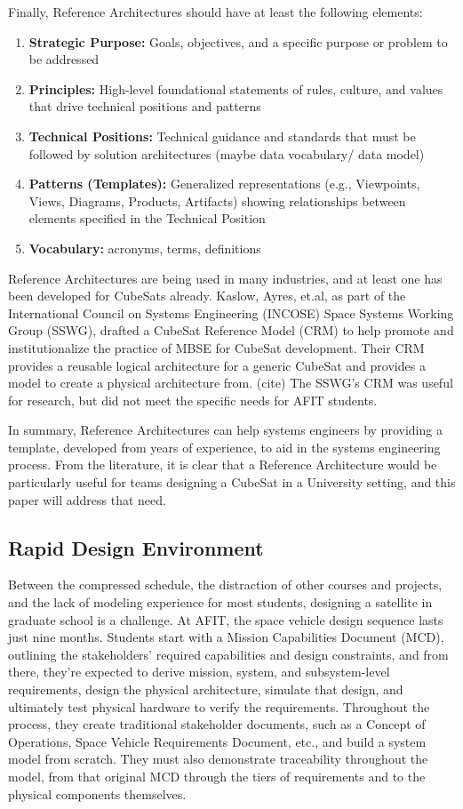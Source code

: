 \documentclass[conference]{joss-pretty}
\begin{document}
Finally, Reference Architectures should have at least the following elements:
\begin{enumerate}
\item{\textbf{Strategic Purpose:} Goals, objectives, and a specific purpose or problem to be addressed}
\item{\textbf{Principles:} High-level foundational statements of rules, culture, and values that drive  technical positions and patterns}
\item{\textbf{Technical Positions:} Technical guidance and standards that must be followed by solution  architectures (maybe data vocabulary/ data model)}
\item{\textbf{Patterns (Templates):} Generalized representations (e.g., Viewpoints, Views, Diagrams, Products, Artifacts) showing relationships between elements specified in the Technical Position}
\item{\textbf{Vocabulary:} acronyms, terms, definitions}
\end{enumerate}

Reference Architectures are being used in many industries, and at least one has been developed for CubeSats already. Kaslow, Ayres, et.al, as part of the International Council on Systems Engineering (INCOSE) Space Systems Working Group (SSWG), drafted a CubeSat Reference Model (CRM) to help promote and institutionalize the practice of MBSE for CubeSat development. Their CRM provides a reusable logical architecture for a generic CubeSat and provides a model to create a physical architecture from. (cite) The SSWG's CRM was useful for research, but did not meet the specific needs for AFIT students.

In summary, Reference Architectures can help systems engineers by providing a template, developed from years of experience, to aid in the systems engineering process. From the literature, it is clear that a Reference Architecture would be particularly useful for teams designing a CubeSat in a University setting, and this paper will address that need.

\subsection{Rapid Design Environment}
Between the compressed schedule, the distraction of other courses and projects, and the lack of modeling experience for most students, designing a satellite in graduate school is a challenge. At AFIT, the space vehicle design sequence lasts just nine months. Students start with a Mission Capabilities Document (MCD), outlining the stakeholders' required capabilities and design constraints, and from there, they're expected to derive mission, system, and subsystem-level requirements, design the physical architecture, simulate that design, and ultimately test physical hardware to verify the requirements. Throughout the process, they create traditional stakeholder documents, such as a Concept of Operations, Space Vehicle Requirements Document, etc., and build a system model from scratch. They must also demonstrate traceability throughout the model, from that original MCD through the tiers of requirements and to the physical components themselves. 
\end{document}
